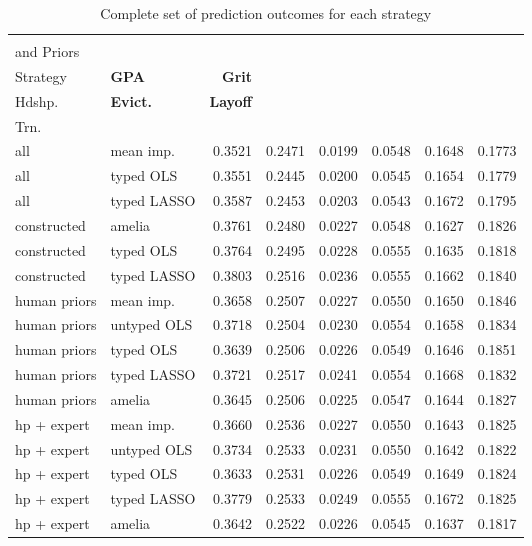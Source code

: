 \begin{table}[ht]
\centering
\caption{Complete set of prediction outcomes for each strategy}
\label{tab:completeresults}
\begin{tabular}{l|l|rrr|rrr}
\toprule
\textbf{\pbox{25cm}{Variables \\ and Priors}} & \textbf{\pbox{25cm}{Imputation \\ Strategy}}          & \textbf{GPA}        & \textbf{Grit} & \textbf{\pbox{25cm}{Matl. \\ Hdshp.}}       & \textbf{Evict.} & \textbf{Layoff}      & \textbf{\pbox{25cm}{Job \\ Trn.}} \\
\midrule
all & mean imp. & 0.3521 & 0.2471 & 0.0199 & 0.0548 & 0.1648 & 0.1773\\
all & typed OLS & 0.3551 & 0.2445 & 0.0200 & 0.0545 & 0.1654 & 0.1779\\
all & typed LASSO & 0.3587 & 0.2453 & 0.0203 & 0.0543 & 0.1672 & 0.1795\\
constructed & amelia & 0.3761 & 0.2480 & 0.0227 & 0.0548 & 0.1627 & 0.1826\\
constructed & typed OLS & 0.3764 & 0.2495 & 0.0228 & 0.0555 & 0.1635 & 0.1818\\
constructed & typed LASSO & 0.3803 & 0.2516 & 0.0236 & 0.0555 & 0.1662 & 0.1840\\
human priors & mean imp. & 0.3658 & 0.2507 & 0.0227 & 0.0550 & 0.1650 & 0.1846\\
human priors & untyped OLS & 0.3718 & 0.2504 & 0.0230 & 0.0554 & 0.1658 & 0.1834\\
human priors & typed OLS & 0.3639 & 0.2506 & 0.0226 & 0.0549 & 0.1646 & 0.1851\\
human priors & typed LASSO & 0.3721 & 0.2517 & 0.0241 & 0.0554 & 0.1668 & 0.1832\\
human priors & amelia & 0.3645 & 0.2506 & 0.0225 & 0.0547 & 0.1644 & 0.1827\\
hp + expert & mean imp. & 0.3660 & 0.2536 & 0.0227 & 0.0550 & 0.1643 & 0.1825\\
hp + expert & untyped OLS & 0.3734 & 0.2533 & 0.0231 & 0.0550 & 0.1642 & 0.1822\\
hp + expert & typed OLS & 0.3633 & 0.2531 & 0.0226 & 0.0549 & 0.1649 & 0.1824\\
hp + expert & typed LASSO & 0.3779 & 0.2533 & 0.0249 & 0.0555 & 0.1672 & 0.1825\\
hp + expert & amelia & 0.3642 & 0.2522 & 0.0226 & 0.0545 & 0.1637 & 0.1817\\

\end{tabular}
\end{table}
